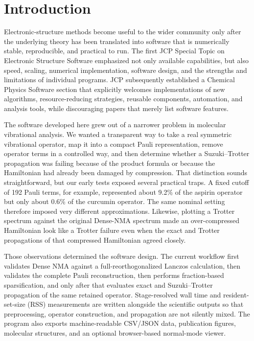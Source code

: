 \documentclass[aip,jcp,reprint,amsmath,amssymb,floatfix]{revtex4-2}
\begin{document}
\section{Introduction}
Electronic-structure methods become useful to the wider community only after the underlying theory has been translated into software that is numerically stable, reproducible, and practical to run. The first JCP Special Topic on Electronic Structure Software emphasized not only available capabilities, but also speed, scaling, numerical implementation, software design, and the strengths and limitations of individual programs.\cite{Sherrill2020Software} JCP subsequently established a Chemical Physics Software section that explicitly welcomes implementations of new algorithms, resource-reducing strategies, reusable components, automation, and analysis tools, while discouraging papers that merely list software features.\cite{Sherrill2021Software}

The software developed here grew out of a narrower problem in molecular vibrational analysis. We wanted a transparent way to take a real symmetric vibrational operator, map it into a compact Pauli representation, remove operator terms in a controlled way, and then determine whether a Suzuki--Trotter propagation was failing because of the product formula or because the Hamiltonian had already been damaged by compression. That distinction sounds straightforward, but our early tests exposed several practical traps. A fixed cutoff of 192 Pauli terms, for example, represented about 9.2\% of the aspirin operator but only about 0.6\% of the curcumin operator. The same nominal setting therefore imposed very different approximations. Likewise, plotting a Trotter spectrum against the original Dense-NMA spectrum made an over-compressed Hamiltonian look like a Trotter failure even when the exact and Trotter propagations of that compressed Hamiltonian agreed closely.

Those observations determined the software design. The current workflow first validates Dense NMA against a full-reorthogonalized Lanczos calculation, then validates the complete Pauli reconstruction, then performs fraction-based sparsification, and only after that evaluates exact and Suzuki--Trotter propagation of the same retained operator. Stage-resolved wall time and resident-set-size (RSS) measurements are written alongside the scientific outputs so that preprocessing, operator construction, and propagation are not silently mixed. The program also exports machine-readable CSV/JSON data, publication figures, molecular structures, and an optional browser-based normal-mode viewer.
\end{document}
